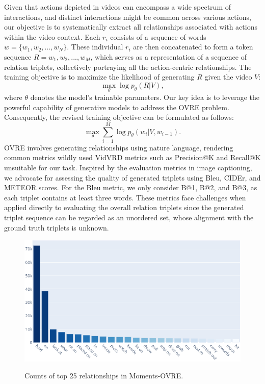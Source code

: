 \documentclass[letterpaper]{article}
\begin{document}
Given that actions depicted in videos can encompass a wide spectrum of interactions, and distinct interactions might be common across various actions, our objective is to systematically extract all relationships associated with actions within the video context.
Each $r_{i}$ consists of a sequence of words $w=\{w_{1},w_{2},...,w_{N}\}$. These individual $r_{i}$ are then concatenated to form a token sequence $R=w_{1},w_{2},...,w_{M}$, which serves as a representation of a sequence of relation triplets, collectively portraying all the action-centric relationships.
The training objective is to maximize the likelihood of generating $R$ given the video $V$:
$$
\underset{\theta}{\max} \log p_{\theta}(R|V),
$$
where $\theta$ denotes the model's trainable parameters.
Our key idea is to leverage the powerful capability of generative models to address the OVRE problem.
Consequently, the revised training objective can be formulated as follows:
$$
\underset{\theta}{\max}\sum_{i=1}^{M}\log p_{\theta}(w_{i}|V,w_{i-1}).
$$
OVRE involves generating relationships using nature language, rendering common metrics wildly used VidVRD metrics such as Precision@K and Recall@K unsuitable for our task.
Inspired by the evaluation metrics in image captioning, we advocate for assessing the quality of generated triplets using Bleu, CIDEr, and METEOR scores.
For the Bleu metric, we only consider B@1, B@2, and B@3, as each triplet contains at least three words.
These metrics face challenges when applied directly to evaluating the overall relation triplets since the generated triplet sequence can be regarded as an unordered set, whose alignment with the ground truth triplets is unknown.

\begin{figure}[t]
\centering
\resizebox{1.0\linewidth}{4cm}
{\includegraphics{fig/rel.png}}
\caption{Counts of top 25 relationships in Moments-OVRE.}
\label{fig:freq}
\end{figure}
\end{document}
